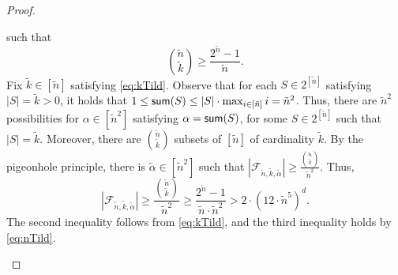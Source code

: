 \documentclass[11pt,letter]{article}
\begin{document}
\begin{proof}
\begin{claimproof}
				  such that 
				  \begin{equation}
				  	\label{eq:kTild}
				  	{\tilde{n} \choose \tilde{k}} \geq \frac{2^{\tilde{n}}-1}{\tilde{n}}.
				  \end{equation}
				   Fix $\tilde{k} \in \left[\tilde{n}\right]$ satisfying \eqref{eq:kTild}. Observe that for each $S \in 2^{[\tilde{n}]}$ satisfying $|S| = \tilde{k}>0$, it holds that $1 \leq \textnormal{\textsf{sum}}(S) \leq |S| \cdot \max_{i \in [\tilde{n}]} i = \tilde{n}^2$. Thus, there are $\tilde{n}^2$ possibilities for $\alpha \in \left[\tilde{n}^2\right]$ satisfying $\alpha = \textnormal{\textsf{sum}}(S)$, for some $S \in 2^{[\tilde{n}]}$ such that $|S| = \tilde{k}$. Moreover, there are ${\tilde{n} \choose \tilde{k}}$ subsets of $[\tilde{n}]$ of cardinality $\tilde{k}$. By the pigeonhole principle, there is $\tilde{\alpha} \in  \left[  \tilde{n}^2 \right]$ such that $|\mathcal{F}_{\tilde{n},\tilde{k},\tilde{\alpha}}| \geq  \frac{{\tilde{n} \choose \tilde{k}}}{\tilde{n}^2}$. Thus,
				   $$|\mathcal{F}_{\tilde{n},\tilde{k},\tilde{\alpha}}| \geq \frac{{\tilde{n} \choose \tilde{k}}}{\tilde{n}^2}  \geq  \frac{2^{\tilde{n}}-1}{\tilde{n} \cdot \tilde{n}^2} > 2 \cdot \left(	12 \cdot \tilde{n}^5 \right)^{d}.$$ The second inequality follows from \eqref{eq:kTild}, and the third inequality holds by \eqref{eq:nTild}. 
		\end{claimproof}
		
	


\end{proof}
\end{document}
